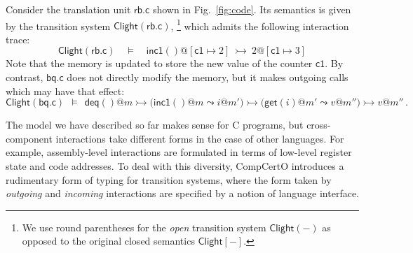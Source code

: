 \documentclass[acmsmall,screen,review,anonymous,nonacm]{acmart}
\newcommand{\kw}[1]{\ensuremath{ \mathsf{#1} }}
\newcommand{\que}{\circ}
\newcommand{\ans}{\bullet}
\begin{document}

\begin{example} \label{ex:overview:clightsem} %
Consider the translation unit $\kw{rb.c}$ shown in Fig.~\ref{fig:code}.
Its semantics is given by 
the transition system $\kw{Clight}(\kw{rb.c})$,\!%
\footnote{%
  We use round parentheses for
  the \emph{open} transition system $\kw{Clight}(-)$
  as opposed to the original closed semantics $\kw{Clight}[-]$.
  }
which admits the following interaction trace:
\[
  \kw{Clight}(\kw{rb.c}) \quad \vDash \quad
  \kw{inc1}()@[\kw{c1} \mapsto 2]
  \: \rightarrowtail \:
  2@[\kw{c1} \mapsto 3]
\]
Note that the memory is updated to store the new value of the counter $\kw{c1}$.
By contrast, $\kw{bq.c}$
does not directly modify the memory,
but it makes outgoing calls which may have that effect:
\[
  \kw{Clight}(\kw{bq.c}) \:\: \vDash \:\:
  \kw{deq}()@m
  \rightarrowtail
  \big( \kw{inc1}()@m \leadsto i@m' \big)
  \rightarrowtail
  \big( \kw{get}(i)@m' \leadsto v@m'' \big)
  \rightarrowtail
  v@m''
  \,.
\]
\end{example}

The model we have described so far
makes sense for C programs,
but cross-component interactions take different forms
in the case of other languages.
For example,
assembly-level interactions are formulated in terms of
low-level register state and code addresses.
To deal with this diversity,
CompCertO introduces a rudimentary form of typing for transition systems,
where the form taken by \emph{outgoing} and \emph{incoming} interactions
are specified by a notion of language interface.
\end{document}
